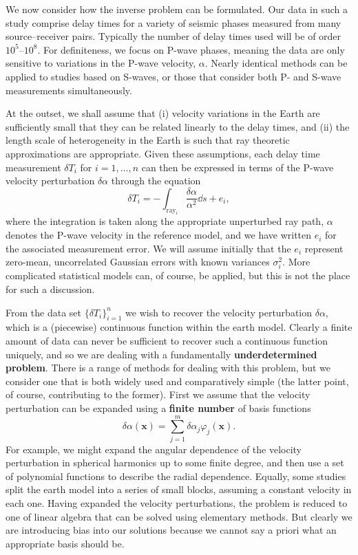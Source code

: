 We now consider how the inverse problem can be formulated. Our data in such a study comprise delay times for a variety of seismic 
phases measured from many source--receiver pairs. Typically the number of delay times used will be of order $10^{5}$--$10^{8}$. For 
definiteness, we focus on P-wave phases, meaning the data are only sensitive to variations in the P-wave velocity, $\alpha$. Nearly 
identical methods can be applied to studies based on S-waves, or those that consider both P- and S-wave measurements simultaneously.

At the outset, we shall assume that (i) velocity variations in the Earth are sufficiently small that they can be related linearly 
to the delay times, and (ii) the length scale of heterogeneity in the Earth is such that ray theoretic approximations are 
appropriate. Given these assumptions, each delay time measurement $\delta T_{i}$ for $i=1,\dots,n$ can then be expressed in terms 
of the P-wave velocity perturbation $\delta\alpha$ through the equation
\begin{equation}
    \delta T_{i} = -\int_{\mathrm{ray}_{i}} \frac{\delta\alpha}{\alpha^{2}} \dd s + e_{i},
    \label{eq:7}
\end{equation}
where the integration is taken along the appropriate unperturbed ray path, $\alpha$ denotes the P-wave velocity in the reference model, 
and we have written $e_{i}$ for the associated measurement error. We will assume initially that the $e_{i}$ represent zero-mean, 
uncorrelated Gaussian errors with known variances $\sigma_{i}^{2}$. More complicated statistical models can, of course, be applied, 
but this is not the place for such a discussion.

From the data set $\{\delta T_{i}\}_{i=1}^{n}$ we wish to recover the velocity perturbation $\delta\alpha$, which is a (piecewise) 
continuous function within the earth model. Clearly a finite amount of data can never be sufficient to recover such a continuous 
function uniquely, and so we are dealing with a fundamentally \textbf{underdetermined problem}. There is a range of methods for dealing with 
this problem, but we consider one that is both widely used and comparatively simple (the latter point, of course, contributing to the 
former). First we assume that the velocity perturbation can be expanded using a \textbf{finite number} of basis functions
\begin{equation}
    \delta\alpha(\mathbf{x}) = \sum_{j=1}^{m} \delta\alpha_{j} \varphi_{j}(\mathbf{x}).
    \label{eq:8}
\end{equation}
For example, we might expand the angular dependence of the velocity perturbation in spherical harmonics up to some finite degree, 
and then use a set of polynomial functions to describe the radial dependence. Equally, some studies split the earth model into a 
series of small blocks, assuming a constant velocity in each one. Having expanded the velocity perturbations, the problem is reduced 
to one of linear algebra that can be solved using elementary methods. But clearly we are introducing bias into our solutions because 
we cannot say a priori what an appropriate basis should be.

